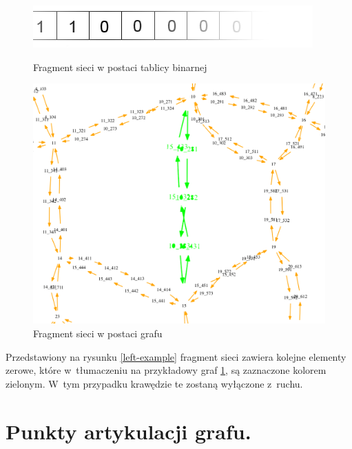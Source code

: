 \documentclass[twoside,12pt]{report}
\begin{document}
\begin{figure}[ht]
\begin{flushleft}
	\begin{minipage}[c]{.47\textwidth}
	\vspace*{80px}
	\centering
	\includegraphics[width=\textwidth]{img/bool}
	\caption{Fragment sieci w postaci tablicy binarnej }
	\label{left-example}
	\end{minipage}%
\end{flushleft}
\begin{flushright}
	\begin{minipage}[c]{.47\textwidth}
	\centering
	\includegraphics[width=\textwidth]{img/bool-efect}
	\caption{Fragment sieci w postaci grafu}
	\label{right-example}
	\end{minipage}
\end{flushright}
\end{figure}

Przedstawiony na rysunku \ref{left-example} fragment sieci zawiera kolejne elementy zerowe, które w~tłumaczeniu na przykładowy graf \ref{right-example}, są zaznaczone kolorem zielonym. W~tym przypadku krawędzie te zostaną wyłączone z~ruchu. 

\section{Punkty artykulacji grafu.}
\end{document}

